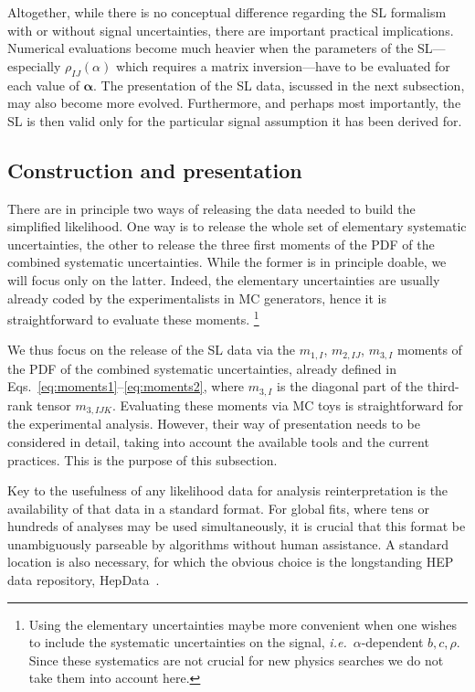 \documentclass[11pt]{article}
\def\ie{{\it i.e.}}
\begin{document}
Altogether, while there is no conceptual difference regarding the SL formalism with or without signal uncertainties, there are important practical implications. Numerical evaluations become much heavier when the parameters of the SL---especially $\rho_{IJ}(\alpha)$ which requires a matrix inversion---have to be evaluated for each value of ${\bm \alpha}$.  The presentation of the SL data, iscussed in the next subsection, may also become more evolved.  
Furthermore, and perhaps most importantly, the SL is then valid only for the particular signal assumption it has been derived for. 




\subsection{Construction and  presentation}


There are in principle two ways of releasing the data needed to build the simplified likelihood. One way %
is to release the whole set of elementary systematic uncertainties, the other to release the three first moments of the PDF of the combined systematic uncertainties. While the former is in principle doable, we will focus only on the latter. Indeed, the elementary uncertainties are usually already  coded by the experimentalists in MC generators, hence it is straightforward to evaluate these moments.%
\footnote{Using the elementary uncertainties maybe more convenient when one wishes to include the systematic uncertainties on the signal, \ie\  $\alpha$-dependent $b,c,\rho$. Since these systematics are not crucial for new physics searches we do not take them into account here.}




We thus focus on the release of the  SL data via the  $m_{1,I}$, $m_{2,IJ}$, $m_{3,I}$
moments   of the PDF of the combined systematic uncertainties,  already defined in Eqs.~\eqref{eq:moments1}--\eqref{eq:moments2}, where $m_{3,I}$ is the diagonal part of the third-rank tensor $m_{3,IJK}$.  Evaluating these moments via MC toys is straightforward for the experimental analysis. However, their way of presentation needs to be  
considered in detail, taking into account  the available tools and the current practices. This is the purpose of this subsection.



Key to the usefulness of any likelihood data for analysis reinterpretation is
the availability of that data in a standard format. For global fits, where tens
or hundreds of analyses may be used simultaneously, it is crucial that this
format be unambiguously parseable by algorithms without human assistance. A
standard location is also necessary, for which the obvious choice is the longstanding
HEP data repository, HepData~\cite{hepdata}.
\end{document}
